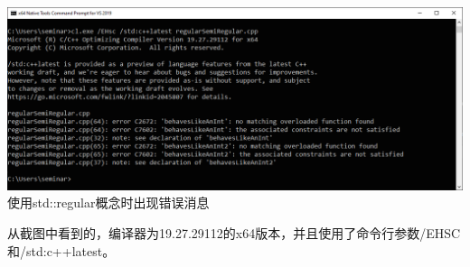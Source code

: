 \begin{center}
\includegraphics[width=1.0\textwidth]{content/3/chapter4/images/10.png}\\
使用std::regular概念时出现错误消息
\end{center}

从截图中看到的，编译器为19.27.29112的x64版本，并且使用了命令行参数/EHSC和/std:c++latest。

